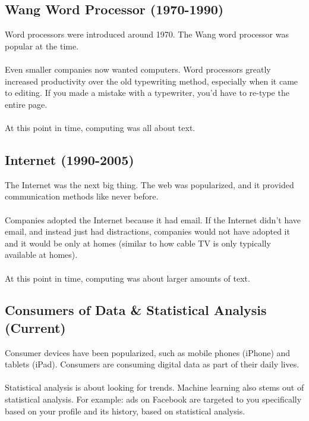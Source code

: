 \documentclass[]{article}
\theoremstyle{definition}
\begin{document}
		\subsection{Wang Word Processor (1970-1990)}
			Word processors were introduced around 1970. The Wang word processor was popular at the time.
			\\ \\
			Even smaller companies now wanted computers. Word processors greatly increased productivity over the old typewriting method, especially when it came to editing. If you made a mistake with a typewriter, you'd have to re-type the entire page.
			\\ \\
			At this point in time, computing was all about text.
		
		\subsection{Internet (1990-2005)}
			The Internet was the next big thing. The web was popularized, and it provided communication methods like never before.
			\\ \\
			Companies adopted the Internet because it had email. If the Internet didn't have email, and instead just had distractions, companies would not have adopted it and it would be only at homes (similar to how cable TV is only typically available at homes).
			\\ \\
			At this point in time, computing was about larger amounts of text.
		
		\subsection{Consumers of Data \& Statistical Analysis (Current)}
			Consumer devices have been popularized, such as mobile phones (iPhone) and tablets (iPad). Consumers are consuming digital data as part of their daily lives.
			\\ \\
			Statistical analysis is about looking for trends. Machine learning also stems out of statistical analysis. For example: ads on Facebook are targeted to you specifically based on your profile and its history, based on statistical analysis.
	
\end{document}
